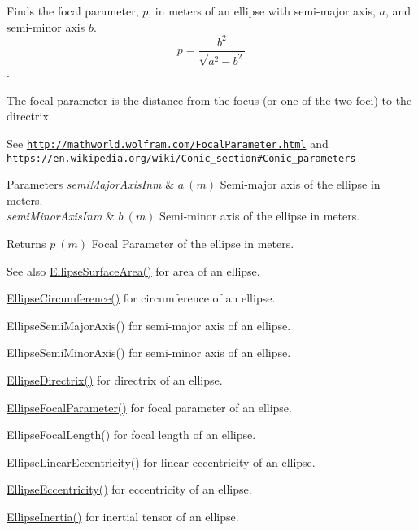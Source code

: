 Finds the focal parameter, $p$, in meters of an ellipse with semi-\/major axis, $a$, and semi-\/minor axis $b$. \[ p=\frac{b^2}{\sqrt{a^2-b^2}} \]. 

The focal parameter is the distance from the focus (or one of the two foci) to the directrix.

See \href{http://mathworld.wolfram.com/FocalParameter.html}{\tt http\+://mathworld.\+wolfram.\+com/\+Focal\+Parameter.\+html} and \href{https://en.wikipedia.org/wiki/Conic_section#Conic_parameters}{\tt https\+://en.\+wikipedia.\+org/wiki/\+Conic\+\_\+section\#\+Conic\+\_\+parameters}


\begin{DoxyParams}{Parameters}
{\em semi\+Major\+Axis\+Inm} & $ a\ (m)$ Semi-\/major axis of the ellipse in meters. \\
\hline
{\em semi\+Minor\+Axis\+Inm} & $ b\ (m)$ Semi-\/minor axis of the ellipse in meters. \\
\hline
\end{DoxyParams}
\begin{DoxyReturn}{Returns}
$ p\ (m)$ Focal Parameter of the ellipse in meters. 
\end{DoxyReturn}
\begin{DoxySeeAlso}{See also}
\mbox{\hyperlink{group___e_g_x_math-_geometry-2_d-_ellipse-_surface_area_ga4ce8c8323e9718ce5458f4ab7f6d823d}{Ellipse\+Surface\+Area()}} for area of an ellipse. 

\mbox{\hyperlink{group___e_g_x_math-_geometry-2_d-_ellipse-_circumference_ga4172802ac674eb53467b44928ac635c7}{Ellipse\+Circumference()}} for circumference of an ellipse. 

Ellipse\+Semi\+Major\+Axis() for semi-\/major axis of an ellipse. 

Ellipse\+Semi\+Minor\+Axis() for semi-\/minor axis of an ellipse. 

\mbox{\hyperlink{group___e_g_x_math-_geometry-2_d-_ellipse-_directrix_gace8f72a8efbc9c18d3eb689151405106}{Ellipse\+Directrix()}} for directrix of an ellipse. 

\mbox{\hyperlink{group___e_g_x_math-_geometry-2_d-_ellipse-_focal_parameter_ga4cd01a38c72c092ef9791351948bf69b}{Ellipse\+Focal\+Parameter()}} for focal parameter of an ellipse. 

Ellipse\+Focal\+Length() for focal length of an ellipse. 

\mbox{\hyperlink{group___e_g_x_math-_geometry-2_d-_ellipse-_linear_eccentricity_gac70b3010e30aa8b73deb50fe2b9b9a91}{Ellipse\+Linear\+Eccentricity()}} for linear eccentricity of an ellipse. 

\mbox{\hyperlink{group___e_g_x_math-_geometry-2_d-_ellipse-_eccentricity_ga6a0a7fba17f782616894cfc447628c33}{Ellipse\+Eccentricity()}} for eccentricity of an ellipse. 

\mbox{\hyperlink{group___e_g_x_math-_geometry-2_d-_ellipse-_inertia_ga10a3049c2f04b50f271fb01dc62e4cf8}{Ellipse\+Inertia()}} for inertial tensor of an ellipse. 
\end{DoxySeeAlso}
